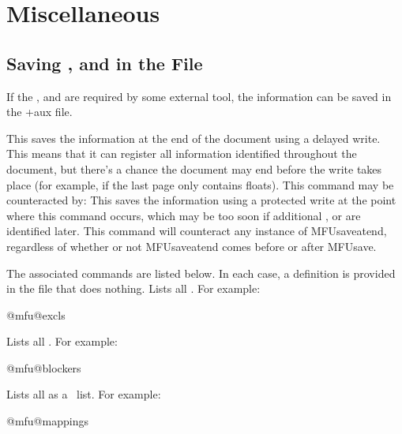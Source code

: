 \documentclass[titlepage=false,oneside,
 fontsize=12pt,captions=tableheading]{scrbook}
\begin{document}
\chapter{Miscellaneous}
\label{sec:misc}

\section{Saving ,  and 
 in the  File}
\label{sec:savetoaux}

If the ,  and  are
required by some external tool, the information can be saved in the
\ext+{aux} file.

This saves the information at the end of the document using a delayed
write. This means that it can register all information identified 
throughout the document, but there's a chance the document may end
before the write takes place (for example, if the last page only
contains floats). This command may be counteracted by:
This saves the information using a protected write at the point
where this command occurs, which may be too soon if additional
,  or  are identified
later. This command will counteract any instance of
\gls{MFUsaveatend}, regardless of whether or not \gls{MFUsaveatend}
comes before or after \gls{MFUsave}.

The associated  commands are listed below. In each case, a
definition is provided in the  file that does nothing.
Lists all .
For example:
\begin{compactcodebox*}
\gls{@mfu@excls}
\end{compactcodebox*}

Lists all .
For example:
\begin{compactcodebox*}
\gls{@mfu@blockers}
\end{compactcodebox*}

Lists all  as a \keyval\ list.
For example:
\begin{compactcodebox*}
\gls{@mfu@mappings}
\end{compactcodebox*}
\end{document}
